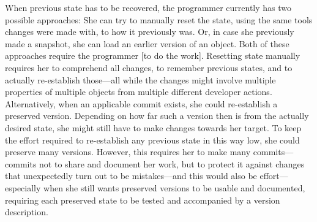 When previous state has to be recovered, the programmer currently has two possible approaches: She can try to manually reset the state, using the same tools changes were made with, to how it previously was. Or, in case she previously made a snapshot, she can load an earlier version of an object.
Both of these approaches require the programmer [to do the work].
Resetting state manually requires her to comprehend all changes, to remember previous states, and to actually re-establish those---all while the changes might involve multiple properties of multiple objects from multiple different developer actions.
Alternatively, when an applicable commit exists, she could re-establish a preserved version.
Depending on how far such a version then is from the actually desired state, she might still have to make changes towards her target.
To keep the effort required to re-establish any previous state in this way low, she could preserve many versions.
However, this requires her to make many commits---commits not to share and document her work, but to protect it against changes that unexpectedly turn out to be mistakes---and this would also be effort---especially when she still wants preserved versions to be usable and documented, requiring each preserved state to be tested and accompanied by a version description.



